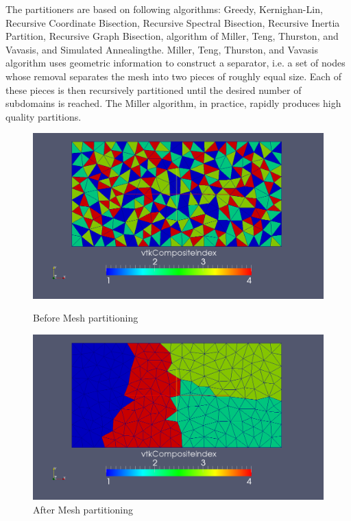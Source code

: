 \documentclass[a4paper, 11pt, oneside]{scrartcl}
\begin{document}
The partitioners are based on following algorithms:
 Greedy, Kernighan-Lin, Recursive Coordinate Bisection, Recursive Spectral Bisection, Recursive Inertia Partition, Recursive Graph Bisection, algorithm of Miller, Teng, Thurston, and Vavasis, and Simulated Annealingthe. Miller, Teng, Thurston, and Vavasis algorithm uses geometric information to construct a separator, i.e. a set of nodes whose removal separates the mesh into two pieces of roughly equal size. Each of these pieces is then recursively partitioned until the desired number of subdomains is reached. The Miller algorithm, in practice, rapidly produces high quality partitions. 
 
\begin{figure}[!htb]
\centering
{}
\centering
\includegraphics[scale=0.2]{./beforePartition.png}
\caption{Before Mesh partitioning}
\endminipage\hfill
\centering
{}
\centering
\includegraphics[scale=.2]{./afterPartition.png}
\caption{After Mesh partitioning}
\endminipage\hfill

\end{figure}
 
\end{document}
